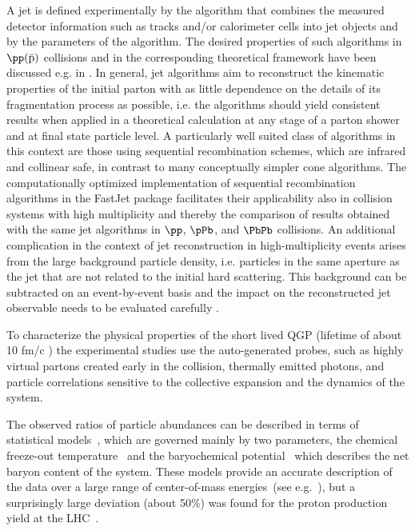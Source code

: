 A jet is defined experimentally by the algorithm that combines the measured detector information such as tracks and/or calorimeter cells into jet objects and by the parameters of the algorithm. 
%
The desired properties of such algorithms in $\pp(\bar{\mathrm{p}})$ collisions and in the corresponding theoretical framework have been discussed e.g. in \cite{Huth:1990mi}. 
%
In general, jet algorithms aim to reconstruct the kinematic properties of the initial parton with as little dependence on the details of its fragmentation process as possible, i.e. the algorithms should yield consistent results when applied in a theoretical calculation at any stage of a parton shower and at final state particle level.
%
A particularly well suited class of algorithms in this context are those using sequential recombination schemes, which are infrared and collinear safe, in contrast to many conceptually simpler cone algorithms.
%
The computationally optimized implementation of
sequential recombination algorithms in the FastJet package
\cite{Cacciari:2005hq} facilitates their applicability also in collision systems with high multiplicity and thereby the comparison of results obtained with the same jet
algorithms in $\pp$, $\pPb$, and $\PbPb$ collisions.
%
An additional complication in the context of jet reconstruction in high-multiplicity events arises from the large background particle density, i.e. particles in the same aperture as the jet that are not related to the initial hard scattering. 
%
This background can be subtracted on an event-by-event basis 
and the impact on the reconstructed jet observable needs to be evaluated carefully \cite{Cacciari:2011tm,Abelev:2013kqa,Abelev:2012ej}. 

%

To characterize the physical properties of the short lived QGP (lifetime of about
10 fm/c \cite{Aamodt:2010jj}) the experimental studies use the auto-generated probes, such as
highly virtual partons created early in the collision, thermally
emitted photons, and particle correlations sensitive to the collective
expansion and the dynamics of the system.


The observed ratios of particle
abundances can be described in terms of statistical
models~\cite{Andronic:2008gu,Cleymans:2006xj}, which are governed
mainly by two parameters, the chemical freeze-out temperature \Tch\
and the baryochemical potential \muB\, which describes the net baryon
content of the system.
These models provide an accurate description of the data over a large
range of center-of-mass energies~(see
e.g.~\cite{BraunMunzinger:2003zz}), but a surprisingly large deviation
(about 50\%) was found for the proton production yield at the LHC~\cite{prl-spectra,
  Abelev:2013vea}.

